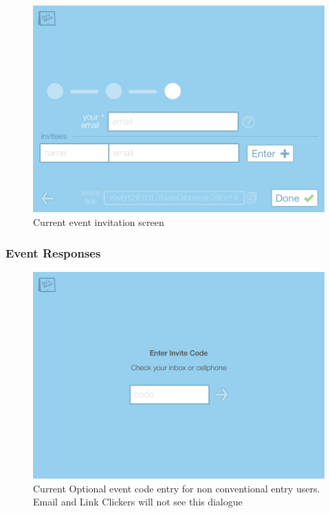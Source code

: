 \documentclass{sigchi}
\begin{document}
\begin{figure}
  \centering
  \includegraphics[width=1.75\columnwidth]{Mockup/Invitees}
  \caption{Current event invitation screen}
\end{figure}
\FloatBarrier

\subsubsection{Event Responses}

\begin{figure}
  \centering
  \includegraphics[width=1.75\columnwidth]{Mockup/EnterEventCode}
  \caption{Current Optional event code entry for non conventional entry users. Email and Link Clickers will not see this dialogue}
\end{figure}
\end{document}
